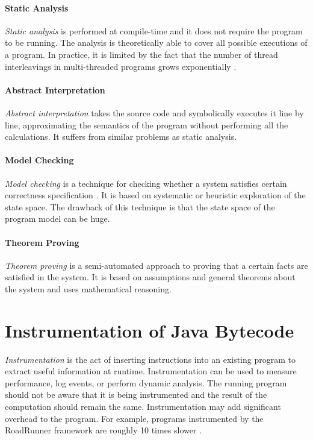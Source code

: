 \paragraph{Static Analysis}
\emph{Static analysis} is performed at compile-time and it does not require the
program to be running. The analysis is theoretically able to cover all possible
executions of a program. In practice, it is limited by the fact that the number
of thread interleavings in multi-threaded programs grows exponentially
\cite{letko}.

\paragraph{Abstract Interpretation}
\emph{Abstract interpretation} takes the source code and symbolically executes
it line by line, approximating the semantics of the program without performing
all the calculations. It suffers from similar problems as static analysis.

\paragraph{Model Checking}
\emph{Model checking} is a technique for checking whether a system satisfies
certain correctness specification \cite{letko}. It is based on systematic or
heuristic exploration of the state space. The drawback of this technique is that
the state space of the program model can be huge.

\paragraph{Theorem Proving}
\emph{Theorem proving} is a semi-automated approach to proving that a certain
facts are satisfied in the system. It is based on assumptions and general
theorems about the system and uses mathematical reasoning.

\section{Instrumentation of Java Bytecode}

\emph{Instrumentation} is the act of inserting instructions into an existing
program to extract useful information at runtime. Instrumentation can be used to
measure performance, log events, or perform dynamic analysis. The running
program should not be aware that it is being instrumented and the result of the
computation should remain the same. Instrumentation may add significant overhead
to the program. For example, programs instrumented by the RoadRunner framework
are roughly 10 times slower \cite{RoadRunner}.

